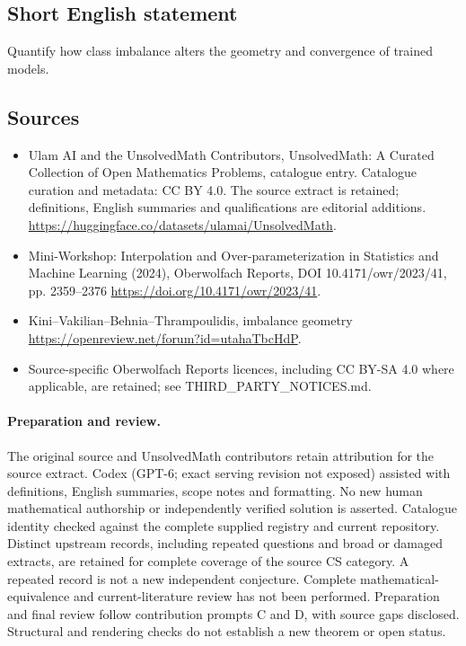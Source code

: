 \documentclass[11pt]{article}
\begin{document}
\subsection{Short English statement}
Quantify how class imbalance alters the geometry and convergence of trained models.
\subsection{Sources}
\begin{itemize}
\item[\hypertarget{source:statement:1}{S1}] Ulam AI and the UnsolvedMath Contributors, UnsolvedMath: A Curated Collection of Open Mathematics Problems, catalogue entry. Catalogue curation and metadata: CC BY 4.0. The source extract is retained; definitions, English summaries and qualifications are editorial additions.
\url{https://huggingface.co/datasets/ulamai/UnsolvedMath}.
\item[\hypertarget{source:statement:2}{S2}] Mini-Workshop: Interpolation and Over-parameterization in Statistics and Machine Learning​ (2024), Oberwolfach Reports, DOI 10.4171/owr/2023/41, pp. 2359--2376
\url{https://doi.org/10.4171/owr/2023/41}.
\item[\hypertarget{source:statement:3}{S3}] Kini--Vakilian--Behnia--Thrampoulidis, imbalance geometry
\url{https://openreview.net/forum?id=utahaTbcHdP}.
\item Source-specific Oberwolfach Reports licences, including CC BY-SA 4.0 where applicable, are retained; see THIRD\_PARTY\_NOTICES.md.
\end{itemize}
\paragraph{Preparation and review.}
The original source and UnsolvedMath contributors retain attribution for the source extract. Codex (GPT-6; exact serving revision not exposed) assisted with definitions, English summaries, scope notes and formatting. No new human mathematical authorship or independently verified solution is asserted. Catalogue identity checked against the complete supplied registry and current repository. Distinct upstream records, including repeated questions and broad or damaged extracts, are retained for complete coverage of the source CS category. A repeated record is not a new independent conjecture. Complete mathematical-equivalence and current-literature review has not been performed. Preparation and final review follow contribution prompts C and D, with source gaps disclosed. Structural and rendering checks do not establish a new theorem or open status.
\label{end:statement}
\end{document}
